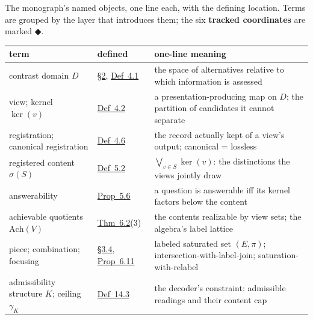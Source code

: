 
The monograph's named objects, one line each, with the defining location. Terms are grouped by the layer that introduces them; the six \textbf{tracked coordinates} are marked ◆.

{\def\LTcaptype{none} %
\begin{longtable}[]{@{}
  >{\raggedright\arraybackslash}p{}
  >{\raggedright\arraybackslash}p{}
  >{\raggedright\arraybackslash}p{}@{}}
\toprule\noalign{}
\begin{minipage}[b]{\linewidth}\raggedright
term
\end{minipage} & \begin{minipage}[b]{\linewidth}\raggedright
defined
\end{minipage} & \begin{minipage}[b]{\linewidth}\raggedright
one-line meaning
\end{minipage} \\
\midrule\noalign{}
\endhead
\bottomrule\noalign{}
\endlastfoot
contrast domain \(D\) & \hyperlink{sec:2}{§2}, \hyperlink{stmt:4.1}{Def~4.1} & the space of alternatives relative to which information is assessed \\
view; kernel \(\ker(v)\) & \hyperlink{stmt:4.2}{Def~4.2} & a presentation-producing map on \(D\); the partition of candidates it cannot separate \\
registration; canonical registration & \hyperlink{stmt:4.6}{Def~4.6} & the record actually kept of a view's output; canonical = lossless \\
registered content \(\sigma(S)\) & \hyperlink{stmt:5.2}{Def~5.2} & \(\bigvee_{v \in S} \ker(v)\): the distinctions the views jointly draw \\
answerability & \hyperlink{stmt:5.6}{Prop~5.6} & a question is answerable iff its kernel factors below the content \\
achievable quotients \(\mathrm{Ach}(V)\) & \hyperlink{stmt:6.2}{Thm~6.2}(3) & the contents realizable by view sets; the algebra's label lattice \\
piece; combination; focusing & \hyperlink{sec:3.4}{§3.4}, \hyperlink{stmt:6.11}{Prop~6.11} & labeled saturated set \((E, \pi)\); intersection-with-label-join; saturation-with-relabel \\
admissibility structure \(K\); ceiling \(\gamma_K\) & \hyperlink{stmt:14.3}{Def~14.3} & the decoder's constraint: admissible readings and their content cap \\

\end{longtable}}
